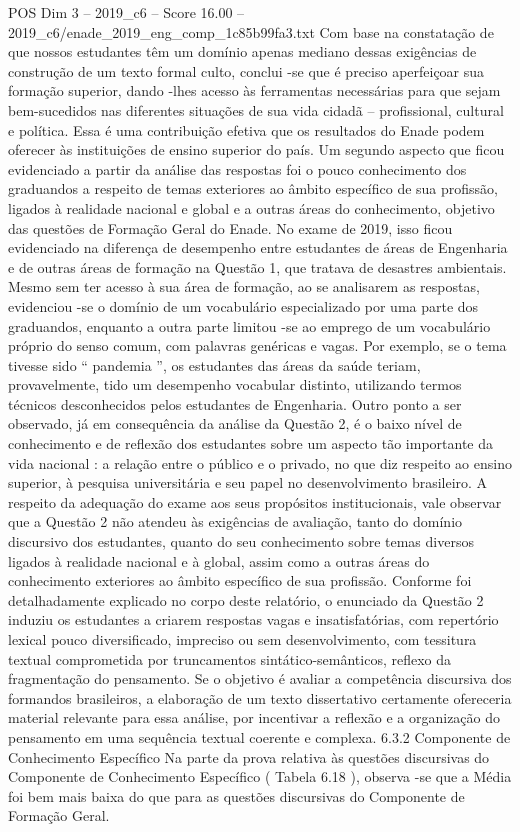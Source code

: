 \begin{textsample}{POS Dim 3 – 2019\_c6 – Score 16.00 – 2019\_c6/enade\_2019\_eng\_comp\_1c85b99fa3.txt}
Com base na constatação de que nossos estudantes têm um domínio apenas mediano dessas exigências de construção de um texto formal culto, conclui -se que é preciso aperfeiçoar sua formação superior, dando -lhes acesso às ferramentas necessárias para que sejam bem-sucedidos nas diferentes situações de sua vida cidadã – profissional, cultural e política.
Essa é uma contribuição efetiva que os resultados do Enade podem oferecer às instituições de ensino superior do país.
Um segundo aspecto que ficou evidenciado a partir da análise das respostas foi o pouco conhecimento dos graduandos a respeito de temas exteriores ao âmbito específico de sua profissão, ligados à realidade nacional e global e a outras áreas do conhecimento, objetivo das questões de Formação Geral do Enade.
No exame de 2019, isso ficou evidenciado na diferença de desempenho entre estudantes de áreas de Engenharia e de outras áreas de formação na Questão 1, que tratava de desastres ambientais.
Mesmo sem ter acesso à sua área de formação, ao se analisarem as respostas, evidenciou -se o domínio de um vocabulário especializado por uma parte dos graduandos, enquanto a outra parte limitou -se ao emprego de um vocabulário próprio do senso comum, com palavras genéricas e vagas.
Por exemplo, se o tema tivesse sido “ pandemia ”, os estudantes das áreas da saúde teriam, provavelmente, tido um desempenho vocabular distinto, utilizando termos técnicos desconhecidos pelos estudantes de Engenharia.
Outro ponto a ser observado, já em consequência da análise da Questão 2, é o baixo nível de conhecimento e de reflexão dos estudantes sobre um aspecto tão importante da vida nacional : a relação entre o público e o privado, no que diz respeito ao ensino superior, à pesquisa universitária e seu papel no desenvolvimento brasileiro.
A respeito da adequação do exame aos seus propósitos institucionais, vale observar que a Questão 2 não atendeu às exigências de avaliação, tanto do domínio discursivo dos estudantes, quanto do seu conhecimento sobre temas diversos ligados à realidade nacional e à global, assim como a outras áreas do conhecimento exteriores ao âmbito específico de sua profissão.
Conforme foi detalhadamente explicado no corpo deste relatório, o enunciado da Questão 2 induziu os estudantes a criarem respostas vagas e insatisfatórias, com repertório lexical pouco diversificado, impreciso ou sem desenvolvimento, com tessitura textual comprometida por truncamentos sintático-semânticos, reflexo da fragmentação do pensamento.
Se o objetivo é avaliar a competência discursiva dos formandos brasileiros, a elaboração de um texto dissertativo certamente ofereceria material relevante para essa análise, por incentivar a reflexão e a organização do pensamento em uma sequência textual coerente e complexa. 6.3.2 Componente de Conhecimento Específico Na parte da prova relativa às questões discursivas do Componente de Conhecimento Específico ( Tabela 6.18 ), observa -se que a Média foi bem mais baixa do que para as questões discursivas do Componente de Formação Geral.

\end{textsample}

